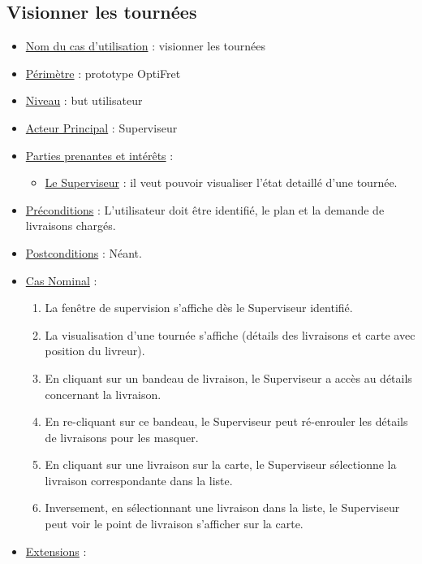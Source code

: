\documentclass[a4paper]{report}
\begin{document}
\subsection{Visionner les tournées}
\begin{itemize}[label = \textbullet, font = \color{orange}]
    \item \underline{Nom du cas d'utilisation} : visionner les tournées
    \item \underline{Périmètre} : prototype OptiFret
    \item \underline{Niveau} : but utilisateur
    \item \underline{Acteur Principal} : Superviseur
    \item \underline{Parties prenantes et intérêts} :
    \begin{itemize}[label = \textbullet, font = \color{blue}]
        \item \underline{Le Superviseur} : il veut pouvoir visualiser l'état detaillé d'une tournée.
    \end{itemize}
    \item \underline{Préconditions} : L'utilisateur doit être identifié, le plan et la demande de livraisons chargés.
    \item \underline{Postconditions} : Néant.
    \item \underline{Cas Nominal} :
    \begin{enumerate}
        \item La fenêtre de supervision s'affiche dès le Superviseur identifié.
        \item La visualisation d'une tournée s'affiche (détails des livraisons
            et carte avec position du livreur).
        \item En cliquant sur un bandeau de livraison, le Superviseur a accès
            au détails concernant la livraison.
        \item En re-cliquant sur ce bandeau, le Superviseur peut ré-enrouler
            les détails de livraisons pour les masquer.
        \item En cliquant sur une  livraison sur la carte, le Superviseur
            sélectionne la livraison correspondante dans la liste.
        \item Inversement, en sélectionnant une livraison dans la liste, le
            Superviseur peut voir le point de livraison s'afficher sur la
            carte.
    \end{enumerate}
    \item \underline{Extensions} :

\end{itemize}
\end{document}
